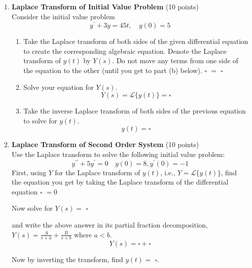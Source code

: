 \begin{enumerate}
  \newpage
  \item \textbf{Laplace Transform of Initial Value Problem} (10 points)\\
  Consider the initial value problem
  $$
  y^{\prime}+3 y=45 t, \quad y(0)=5
  $$
  \begin{enumerate}[label=(\alph*)]
    \item Take the Laplace transform of both sides of the given differential equation to create the corresponding algebraic equation. Denote the Laplace transform of $y(t)$ by $Y(s)$. Do not move any terms from one side of the equation to the other (until you get to part (b) below).
    $\square$ $=$ $\square$
    \begin{subanswer}
    \end{subanswer}
    \item Solve your equation for $Y(s)$.
    $$
    Y(s)=\mathcal{L}\{y(t)\}=\square
    $$
    \begin{subanswer}
    \end{subanswer}
    \item Take the inverse Laplace transform of both sides of the previous equation to solve for $y(t)$.
    $$
    y(t)=\square
    $$
    \begin{subanswer}
    \end{subanswer}
  \end{enumerate}

  \item \textbf{Laplace Transform of Second Order System} (10 points)\\
  Use the Laplace transform to solve the following initial value problem:
  $$
  y^{\prime \prime}+5 y^{\prime}=0 \quad y(0)=8, y^{\prime}(0)=-1
  $$
  First, using $Y$ for the Laplace transform of $y(t)$, i.e., $Y=\mathcal{L}\{y(t)\}$, find the equation you get by taking the Laplace transform of the differential equation
  $\square$ $=0$
  \begin{subanswer}
  \end{subanswer}
  Now solve for $Y(s)=$ $\square$
  \begin{subanswer}
  \end{subanswer}
  and write the above answer in its partial fraction decomposition, $Y(s)=\frac{A}{s+a}+\frac{B}{s+b}$ where $a<b$.
  $$
  Y(s)=\square+\square
  $$
  \begin{subanswer}
  \end{subanswer}
  Now by inverting the transform, find $y(t)=$ $\square$.
  \begin{subanswer}
  \end{subanswer}


\end{enumerate}
